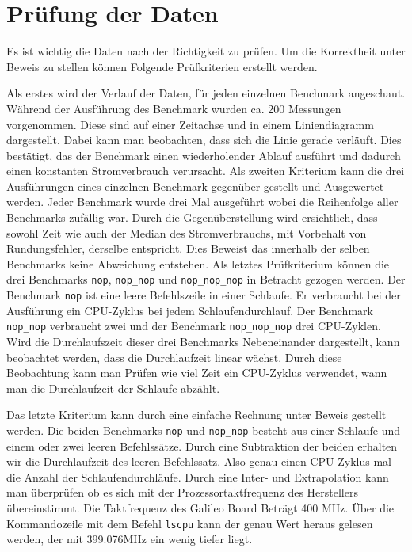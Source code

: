\section{Prüfung der Daten}

Es ist wichtig die Daten nach der Richtigkeit zu prüfen. Um die Korrektheit unter Beweis zu stellen können Folgende Prüfkriterien erstellt werden.
\par
Als erstes wird der Verlauf der Daten, für jeden einzelnen Benchmark angeschaut. Während der Ausführung des Benchmark wurden ca. 200 Messungen vorgenommen. Diese sind auf einer Zeitachse und in einem Liniendiagramm dargestellt. Dabei kann man beobachten, dass sich die Linie gerade verläuft. Dies bestätigt, das der Benchmark einen wiederholender Ablauf ausführt und dadurch einen konstanten Stromverbrauch verursacht. Als zweiten Kriterium kann die drei Ausführungen eines einzelnen Benchmark gegenüber gestellt und Ausgewertet werden. Jeder Benchmark wurde drei Mal ausgeführt wobei die Reihenfolge aller Benchmarks zufällig war. Durch die Gegenüberstellung wird ersichtlich, dass sowohl Zeit wie auch der Median des Stromverbrauchs, mit Vorbehalt von Rundungsfehler, derselbe entspricht. Dies Beweist das innerhalb der selben Benchmarks keine Abweichung entstehen. Als letztes Prüfkriterium können die drei Benchmarks \texttt{nop}, \texttt{nop\_nop} und \texttt{nop\_nop\_nop} in Betracht gezogen werden. Der Benchmark \texttt{nop} ist eine leere Befehlszeile in einer Schlaufe. Er verbraucht bei der Ausführung ein CPU-Zyklus bei jedem Schlaufendurchlauf. Der Benchmark \texttt{nop\_nop} verbraucht zwei und der Benchmark \texttt{nop\_nop\_nop} drei CPU-Zyklen. Wird die Durchlaufszeit dieser drei Benchmarks Nebeneinander dargestellt, kann beobachtet werden, dass die Durchlaufzeit linear wächst. Durch diese Beobachtung kann man Prüfen wie viel Zeit ein CPU-Zyklus verwendet, wann man die Durchlaufzeit der Schlaufe abzählt.
\par
Das letzte Kriterium kann durch eine einfache Rechnung unter Beweis gestellt werden. Die beiden Benchmarks \texttt{nop} und \texttt{nop\_nop} besteht aus einer Schlaufe und einem oder zwei leeren Befehlssätze. Durch eine Subtraktion der beiden erhalten wir die Durchlaufzeit des leeren Befehlssatz. Also genau einen CPU-Zyklus mal die Anzahl der Schlaufendurchläufe. Durch eine Inter- und Extrapolation kann man überprüfen ob es sich mit der Prozessortaktfrequenz des Herstellers übereinstimmt. Die Taktfrequenz des Galileo Board Beträgt 400 MHz. Über die Kommandozeile mit dem Befehl \texttt{lscpu} kann der genau Wert heraus gelesen werden, der mit 399.076MHz ein wenig tiefer liegt.

